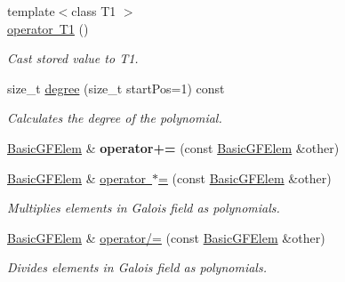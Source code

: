\begin{DoxyCompactItemize}
\item 
\mbox{\label{class_g_flinalg_1_1_basic_g_f_elem_ac44262f5d1f81b0ed7e955d1a37036dc}} 
{\footnotesize template$<$class T1 $>$ }\\\mbox{\hyperlink{class_g_flinalg_1_1_basic_g_f_elem_ac44262f5d1f81b0ed7e955d1a37036dc}{operator T1}} ()
\begin{DoxyCompactList}\small\item\em Cast stored value to T1. \end{DoxyCompactList}\item 
\mbox{\label{class_g_flinalg_1_1_basic_g_f_elem_aefa6f98b17c1d163516ae8ef8dd0833b}} 
size\+\_\+t \mbox{\hyperlink{class_g_flinalg_1_1_basic_g_f_elem_aefa6f98b17c1d163516ae8ef8dd0833b}{degree}} (size\+\_\+t start\+Pos=1) const
\begin{DoxyCompactList}\small\item\em Calculates the degree of the polynomial. \end{DoxyCompactList}\item 
\mbox{\label{class_g_flinalg_1_1_basic_g_f_elem_a89a118ee40e248977273a67d38d1e56c}} 
\mbox{\hyperlink{class_g_flinalg_1_1_basic_g_f_elem}{Basic\+G\+F\+Elem}} \& {\bfseries operator+=} (const \mbox{\hyperlink{class_g_flinalg_1_1_basic_g_f_elem}{Basic\+G\+F\+Elem}} \&other)
\item 
\mbox{\label{class_g_flinalg_1_1_basic_g_f_elem_a764681310308fe5954596533db3a9ad5}} 
\mbox{\hyperlink{class_g_flinalg_1_1_basic_g_f_elem}{Basic\+G\+F\+Elem}} \& \mbox{\hyperlink{class_g_flinalg_1_1_basic_g_f_elem_a764681310308fe5954596533db3a9ad5}{operator $\ast$=}} (const \mbox{\hyperlink{class_g_flinalg_1_1_basic_g_f_elem}{Basic\+G\+F\+Elem}} \&other)
\begin{DoxyCompactList}\small\item\em Multiplies elements in Galois field as polynomials. \end{DoxyCompactList}\item 
\mbox{\label{class_g_flinalg_1_1_basic_g_f_elem_ab6ddbad55a253ebda30fae5665b9fa70}} 
\mbox{\hyperlink{class_g_flinalg_1_1_basic_g_f_elem}{Basic\+G\+F\+Elem}} \& \mbox{\hyperlink{class_g_flinalg_1_1_basic_g_f_elem_ab6ddbad55a253ebda30fae5665b9fa70}{operator/=}} (const \mbox{\hyperlink{class_g_flinalg_1_1_basic_g_f_elem}{Basic\+G\+F\+Elem}} \&other)
\begin{DoxyCompactList}\small\item\em Divides elements in Galois field as polynomials. \end{DoxyCompactList}\end{DoxyCompactItemize}
